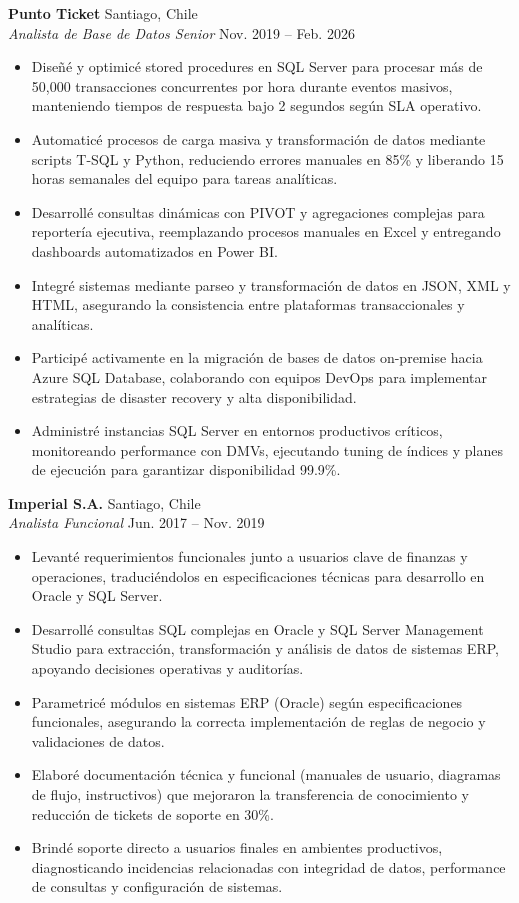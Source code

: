 \documentclass[11pt,letterpaper]{article}
\begin{document}
\textbf{Punto Ticket} \hfill Santiago, Chile\\
\textit{Analista de Base de Datos Senior} \hfill Nov. 2019 – Feb. 2026
\begin{itemize}
  \item Diseñé y optimicé stored procedures en SQL Server para procesar más de 50,000 transacciones concurrentes por hora durante eventos masivos, manteniendo tiempos de respuesta bajo 2 segundos según SLA operativo.
  \item Automaticé procesos de carga masiva y transformación de datos mediante scripts T-SQL y Python, reduciendo errores manuales en 85\% y liberando 15 horas semanales del equipo para tareas analíticas.
  \item Desarrollé consultas dinámicas con PIVOT y agregaciones complejas para reportería ejecutiva, reemplazando procesos manuales en Excel y entregando dashboards automatizados en Power BI.
  \item Integré sistemas mediante parseo y transformación de datos en JSON, XML y HTML, asegurando la consistencia entre plataformas transaccionales y analíticas.
  \item Participé activamente en la migración de bases de datos on-premise hacia Azure SQL Database, colaborando con equipos DevOps para implementar estrategias de disaster recovery y alta disponibilidad.
  \item Administré instancias SQL Server en entornos productivos críticos, monitoreando performance con DMVs, ejecutando tuning de índices y planes de ejecución para garantizar disponibilidad 99.9\%.
\end{itemize}
\vspace{2pt}
\textbf{Imperial S.A.} \hfill Santiago, Chile\\
\textit{Analista Funcional} \hfill Jun. 2017 – Nov. 2019
\begin{itemize}
  \item Levanté requerimientos funcionales junto a usuarios clave de finanzas y operaciones, traduciéndolos en especificaciones técnicas para desarrollo en Oracle y SQL Server.
  \item Desarrollé consultas SQL complejas en Oracle y SQL Server Management Studio para extracción, transformación y análisis de datos de sistemas ERP, apoyando decisiones operativas y auditorías.
  \item Parametricé módulos en sistemas ERP (Oracle) según especificaciones funcionales, asegurando la correcta implementación de reglas de negocio y validaciones de datos.
  \item Elaboré documentación técnica y funcional (manuales de usuario, diagramas de flujo, instructivos) que mejoraron la transferencia de conocimiento y reducción de tickets de soporte en 30\%.
  \item Brindé soporte directo a usuarios finales en ambientes productivos, diagnosticando incidencias relacionadas con integridad de datos, performance de consultas y configuración de sistemas.
\end{itemize}
\end{document}
